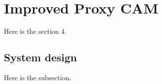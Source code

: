 \section{Improved Proxy CAM} \label{sec:iproxy_cam}

Here is the section 4.

\subsection{System design}

Here is the subsection.